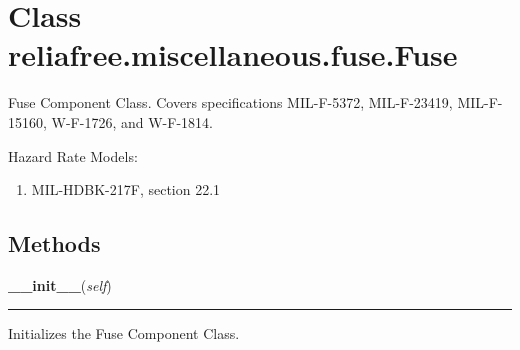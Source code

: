 %
%
%


\section{Class reliafree.miscellaneous.fuse.Fuse}

    \label{reliafree:miscellaneous:fuse:Fuse}
Fuse Component Class. Covers specifications MIL-F-5372, MIL-F-23419, 
MIL-F-15160, W-F-1726, and W-F-1814.

Hazard Rate Models:

\begin{enumerate}

\setlength{\parskip}{0.5ex}
  \item MIL-HDBK-217F, section 22.1

\end{enumerate}



  \subsection{Methods}

    \label{reliafree:miscellaneous:fuse:Fuse:__init__}

    \vspace{0.5ex}

\hspace{.8\funcindent}\begin{boxedminipage}{\funcwidth}

    \raggedright \textbf{\_\_init\_\_}(\textit{self})

    \vspace{-1.5ex}

    \rule{\textwidth}{0.5\fboxrule}
\setlength{\parskip}{2ex}
    Initializes the Fuse Component Class.

\setlength{\parskip}{1ex}
    \end{boxedminipage}

